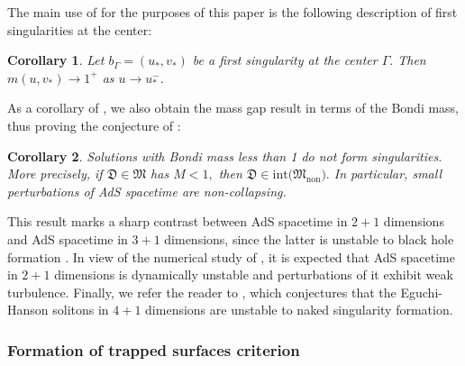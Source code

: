 \documentclass[11pt]{article}
\newtheorem{corollary}{Corollary}[section]
\numberwithin{equation}{section}
\begin{document}
The main use of  for the purposes of this paper is the following description of first singularities at the center:
\begin{corollary}
    Let $b_{\Gamma}=(u_*,v_*)$ be a first singularity at the center $\Gamma.$ Then $m(u,v_*)\rightarrow1^+$ as $u\rightarrow u_*^-.$
\end{corollary}

As a corollary of , we also obtain the mass gap result in terms of the Bondi mass, thus proving the conjecture of \cite{ADS3}:
\begin{corollary}\label{bizcorollary}
    Solutions with Bondi mass less than 1 do not form singularities. More precisely, if $\mathfrak{D}\in\mathfrak{M}$ has $M<1,$ then $\mathfrak{D}\in\mathrm{int}\big(\mathfrak{M}_{\mathrm{non}}\big).$ In particular, small perturbations of AdS spacetime are non-collapsing.
\end{corollary}
This result marks a sharp contrast between AdS spacetime in $2+1$ dimensions and AdS spacetime in $3+1$ dimensions, since the latter is unstable to black hole formation \cite{dafhol,BzRo,nulldust,vlasov}. In view of the numerical study of \cite{ADS3}, it is expected that AdS spacetime in $2+1$ dimensions is dynamically unstable and perturbations of it exhibit weak turbulence. Finally, we refer the reader to \cite{dafhol}, which conjectures that the Eguchi-Hanson solitons in $4+1$ dimensions are unstable to naked singularity formation.

\subsubsection{Formation of trapped surfaces criterion}\label{trapped surface section intro}
\end{document}
